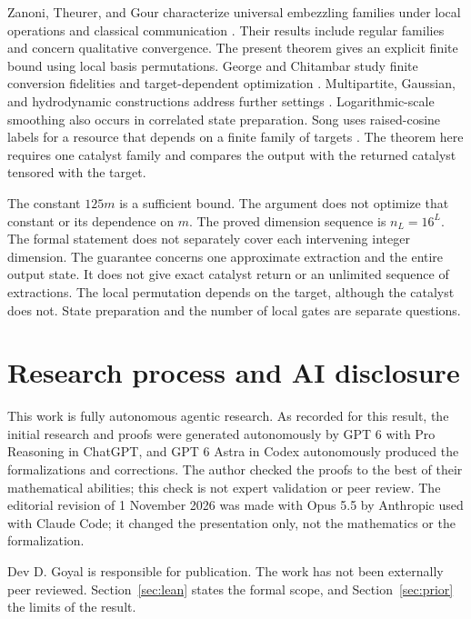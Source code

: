 \documentclass[11pt]{article}
\begin{document}
Zanoni, Theurer, and Gour characterize universal embezzling families under local operations and classical communication \cite{ztg}. Their results include regular families and concern qualitative convergence. The present theorem gives an explicit finite bound using local basis permutations. George and Chitambar study finite conversion fidelities and target-dependent optimization \cite{gc}. Multipartite, Gaussian, and hydrodynamic constructions address further settings \cite{multipartite,gaussian,hydro}. Logarithmic-scale smoothing also occurs in correlated state preparation. Song uses raised-cosine labels for a resource that depends on a finite family of targets \cite{song}. The theorem here requires one catalyst family and compares the output with the returned catalyst tensored with the target.

The constant $125m$ is a sufficient bound. The argument does not optimize that constant or its dependence on $m$. The proved dimension sequence is $n_L=16^L$. The formal statement does not separately cover each intervening integer dimension. The guarantee concerns one approximate extraction and the entire output state. It does not give exact catalyst return or an unlimited sequence of extractions. The local permutation depends on the target, although the catalyst does not. State preparation and the number of local gates are separate questions.

\section{Research process and AI disclosure}\label{sec:disclosure}

This work is fully autonomous agentic research. As recorded for this result, the initial research and proofs were generated autonomously by GPT 6 with Pro Reasoning in ChatGPT, and GPT 6 Astra in Codex autonomously produced the formalizations and corrections. The author checked the proofs to the best of their mathematical abilities; this check is not expert validation or peer review. The editorial revision of 1 November 2026 was made with Opus 5.5 by Anthropic used with Claude Code; it changed the presentation only, not the mathematics or the formalization.

Dev D. Goyal is responsible for publication. The work has not been externally peer reviewed. Section~\ref{sec:lean} states the formal scope, and Section~\ref{sec:prior} the limits of the result.
\end{document}
